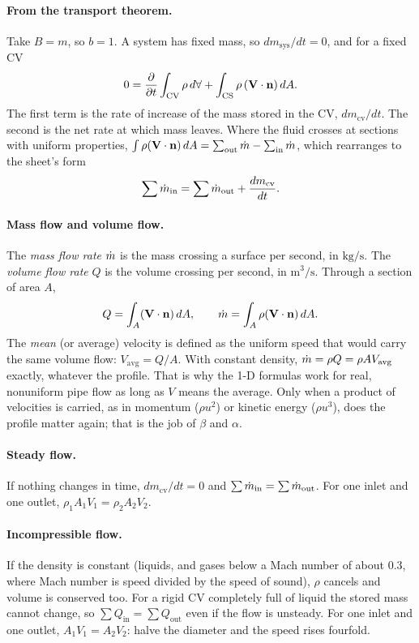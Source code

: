\paragraph{From the transport theorem.} Take $B = m$, so $b = 1$. A system has fixed mass, so $dm_\text{sys}/dt = 0$, and for a fixed CV
\[
0 = \frac{\partial }{\partial t}\int_\text{CV}\rho\, d\forall + \int_\text{CS}\rho\,(\mathbf{V}\cdot\mathbf{n})\, dA .
\]
The first term is the rate of increase of the mass stored in the CV, $dm_\text{cv}/dt$. The second is the net rate at which mass leaves. Where the fluid crosses at sections with uniform properties, $\int\rho(\mathbf{V}\cdot\mathbf{n})\,dA = \sum_\text{out}\dot m - \sum_\text{in}\dot m$, which rearranges to the sheet's form
\[
\sum\dot m_\text{in} = \sum\dot m_\text{out} + \frac{dm_\text{cv}}{dt}.
\]

\paragraph{Mass flow and volume flow.} The \emph{mass flow rate} $\dot m$ is the mass crossing a surface per second, in $\mathrm{kg/s}$. The \emph{volume flow rate} $Q$ is the volume crossing per second, in $\mathrm{m^3/s}$. Through a section of area $A$,
\[
Q = \int_A (\mathbf{V}\cdot\mathbf{n})\, dA, \qquad \dot m = \int_A \rho(\mathbf{V}\cdot\mathbf{n})\, dA .
\]
The \emph{mean} (or average) velocity is defined as the uniform speed that would carry the same volume flow: $V_\text{avg} = Q/A$. With constant density, $\dot m = \rho Q = \rho AV_\text{avg}$ exactly, whatever the profile. That is why the 1-D formulas work for real, nonuniform pipe flow as long as $V$ means the average. Only when a product of velocities is carried, as in momentum ($\rho u^2$) or kinetic energy ($\rho u^3$), does the profile matter again; that is the job of $\beta$ and $\alpha$.

\paragraph{Steady flow.} If nothing changes in time, $dm_\text{cv}/dt = 0$ and $\sum\dot m_\text{in} = \sum\dot m_\text{out}$. For one inlet and one outlet, $\rho_1A_1V_1 = \rho_2A_2V_2$.

\paragraph{Incompressible flow.} If the density is constant (liquids, and gases below a Mach number of about $0.3$, where Mach number is speed divided by the speed of sound), $\rho$ cancels and volume is conserved too. For a rigid CV completely full of liquid the stored mass cannot change, so $\sum Q_\text{in} = \sum Q_\text{out}$ even if the flow is unsteady. For one inlet and one outlet, $A_1V_1 = A_2V_2$: halve the diameter and the speed rises fourfold.

